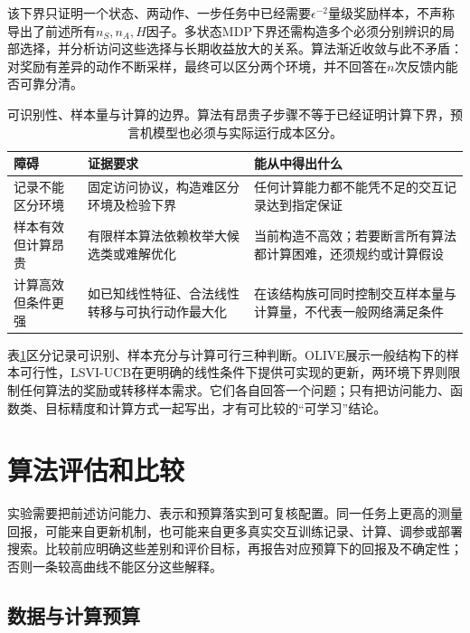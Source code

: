该下界只证明一个状态、两动作、一步任务中已经需要$\epsilon^{-2}$量级奖励样本，不声称导出了前述所有$n_S,n_A,H$因子。多状态MDP下界还需构造多个必须分别辨识的局部选择，并分析访问这些选择与长期收益放大的关系。算法渐近收敛与此不矛盾：对奖励有差异的动作不断采样，最终可以区分两个环境，并不回答在$n$次反馈内能否可靠分清。

\begin{table}[t]
  \centering
  \small
  \begin{tabularx}{\linewidth}{>{\raggedright\arraybackslash}p{26mm} >{\raggedright\arraybackslash}X >{\raggedright\arraybackslash}X}
    \toprule
    障碍 & 证据要求 & 能从中得出什么 \\
    \midrule
    记录不能区分环境 & 固定访问协议，构造难区分环境及检验下界 & 任何计算能力都不能凭不足的交互记录达到指定保证 \\
    样本有效但计算昂贵 & 有限样本算法依赖枚举大候选类或难解优化 & 当前构造不高效；若要断言所有算法都计算困难，还须规约或计算假设 \\
    计算高效但条件更强 & 如已知线性特征、合法线性转移与可执行动作最大化 & 在该结构族可同时控制交互样本量与计算量，不代表一般网络满足条件 \\
    \bottomrule
  \end{tabularx}
  \caption{可识别性、样本量与计算的边界。算法有昂贵子步骤不等于已经证明计算下界，预言机模型也必须与实际运行成本区分。}
  \label{tab:rl-learning-statistical-computational}
\end{table}

表\ref{tab:rl-learning-statistical-computational}区分记录可识别、样本充分与计算可行三种判断。OLIVE展示一般结构下的样本可行性，LSVI-UCB在更明确的线性条件下提供可实现的更新，两环境下界则限制任何算法的奖励或转移样本需求。它们各自回答一个问题；只有把访问能力、函数类、目标精度和计算方式一起写出，才有可比较的“可学习”结论。

\section{算法评估和比较}
\label{sec:rl-learning-evaluation}

实验需要把前述访问能力、表示和预算落实到可复核配置。同一任务上更高的测量回报，可能来自更新机制，也可能来自更多真实交互训练记录、计算、调参或部署搜索。比较前应明确这些差别和评价目标，再报告对应预算下的回报及不确定性；否则一条较高曲线不能区分这些解释。

\subsection{数据与计算预算}
\label{sec:rl-learning-budget}

